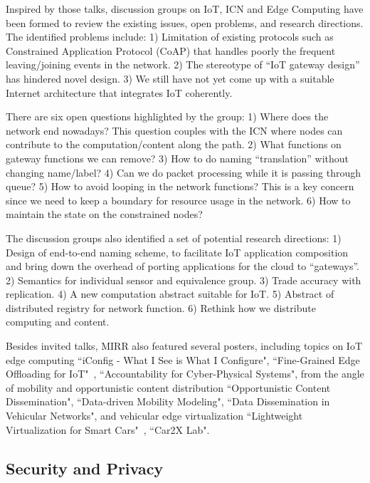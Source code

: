 Inspired by those talks, discussion groups on IoT, ICN and Edge Computing
have been formed to review the existing issues, open problems, and
research directions. The identified problems include: 1) Limitation
of existing protocols such as Constrained Application Protocol (CoAP) that
handles poorly the frequent leaving/joining events in the network. 2) The
stereotype of ``IoT gateway design'' has hindered novel design. 3) We still
have not yet come up with a suitable Internet architecture that integrates
IoT coherently.

There are six open questions highlighted by the group: 1) Where does the network
end nowadays? This question couples
with the ICN where nodes can contribute to the computation/content along
the path. 2) What functions on gateway functions we can remove? 3) How to do
naming ``translation'' without changing name/label? 4) Can we do packet
processing while it is passing through queue? 5) How to avoid looping in
the network functions? This is a key concern since we need to keep a
boundary for resource usage in the network. 6) How to maintain the state on
the constrained nodes?

The discussion groups also identified a set of potential
research directions: 1) Design of end-to-end naming scheme, to facilitate IoT
application composition and bring down the overhead of porting applications
for the cloud to ``gateways''. 2) Semantics for individual sensor and
equivalence group. 3) Trade accuracy with replication. 4) A new computation
abstract suitable for IoT. 5) Abstract of distributed registry for network
function. 6) Rethink how we distribute computing and content.

Besides invited talks, MIRR also featured several posters, including
topics on IoT edge computing ``iConfig - What I See is What I Configure",
``Fine-Grained Edge Offloading for IoT"~\cite{cozzolino:hotconnet:2017},
``Accountability for Cyber-Physical Systems", from the angle of 
mobility and opportunistic content distribution ``Opportunistic Content Dissemination",
``Data-driven Mobility Modeling",
``Data Dissemination in Vehicular Networks", and vehicular edge virtualization
``Lightweight Virtualization for Smart Cars"~\cite{rmorabito:im:2017},
``Car2X Lab".


\subsection{Security and Privacy}

